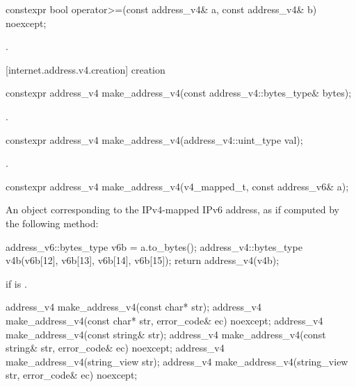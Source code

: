 %
\begin{itemdecl}
constexpr bool operator>=(const address_v4& a, const address_v4& b) noexcept;
\end{itemdecl}

\begin{itemdescr}
\pnum
\returns {}.
\end{itemdescr}



%
[internet.address.v4.creation]{ creation}

\begin{itemdecl}
constexpr address_v4 make_address_v4(const address_v4::bytes_type& bytes);
\end{itemdecl}

\begin{itemdescr}
\pnum
\returns {}.
\end{itemdescr}

\begin{itemdecl}
constexpr address_v4 make_address_v4(address_v4::uint_type val);
\end{itemdecl}

\begin{itemdescr}
\pnum
\returns {}.
\end{itemdescr}

\begin{itemdecl}
constexpr address_v4 make_address_v4(v4_mapped_t, const address_v6& a);
\end{itemdecl}

\begin{itemdescr}
\pnum
\returns An  object corresponding to the IPv4-mapped IPv6 address, as if computed by the following method: 
\begin{codeblock}
address_v6::bytes_type v6b = a.to_bytes();
address_v4::bytes_type v4b(v6b[12], v6b[13], v6b[14], v6b[15]);
return address_v4(v4b);
\end{codeblock}


\pnum
\remarks {} if  is .
\end{itemdescr}

\begin{itemdecl}
address_v4 make_address_v4(const char* str);
address_v4 make_address_v4(const char* str, error_code& ec) noexcept;
address_v4 make_address_v4(const string& str);
address_v4 make_address_v4(const string& str, error_code& ec) noexcept;
address_v4 make_address_v4(string_view str);
address_v4 make_address_v4(string_view str, error_code& ec) noexcept;
\end{itemdecl}

